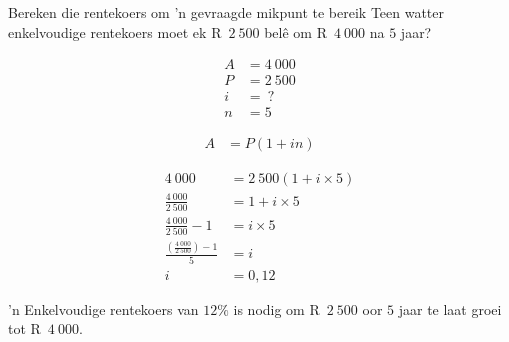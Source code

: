 \begin{wex}{Bereken die rentekoers om 'n gevraagde mikpunt te bereik}{
    Teen watter enkelvoudige rentekoers moet ek R~$2~500$ bel\^e om R~$4~000$ na $5$ jaar?}{

    \begin{align*}
	A &= 4~000\\
	P &= 2~500\\
	i &= ~?\\
	n &= 5
    \end{align*}

    \begin{align*}
	A &= P(1 + in)
    \end{align*}

    \begin{align*}
	4~000 &= 2~500(1 + i \times 5)\\
	\frac{4~000}{2~500} &= 1 + i \times 5\\
	\frac{4~000}{2~500} - 1&= i \times 5\\
	\frac{(\frac{4~000}{2~500}) - 1}{5} &= i\\
	i &= 0,12
    \end{align*}

    'n Enkelvoudige rentekoers van $12\%$ is nodig om R~$2~500$ oor $5$ jaar te laat groei tot R~$4~000$.
    }
\end{wex}

% 
% 
% 


